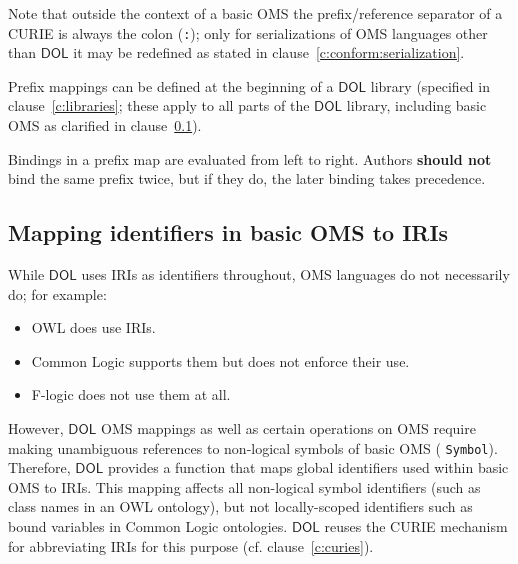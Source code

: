 \documentclass[10pt,fleqn,final]{scrreprt}
\makeatletter
\newcommand*{\cf}{cf.\@\xspace}
\newcommand*\CommentAuthor{}
\renewcommand*\CommentAuthor{#1}}
\newcommand*\CommentDate{}
\renewcommand*\CommentDate{#1}}
\newcommand*\CommentId{}
\renewcommand*\CommentId{#1}}
\newcommand*\CommentType{}
\renewcommand*\CommentType{#1}}
\newcommand*{\SetCommentColorByType}[1]{%
\edef\localType{{#1}}%
\expandafter\ifstrequal\localType{q-aut}{\colorlet{CommentColor}{red}}{%
\expandafter\ifstrequal\localType{q-all}{\colorlet{CommentColor}{orange}}{%
\expandafter\ifstrequal\localType{todo}{\colorlet{CommentColor}{orange}}{%
\expandafter\ifstrequal\localType{fyi}{\colorlet{CommentColor}{lightgray}}{%
\colorlet{CommentColor}{yellow}}}}}}
\newcommand*{\SetCommentPrefixByType}[1]{%
\edef\localType{{#1}}%
\expandafter\@ifmtarg\localType{%
\edef\CommentPrefix{}%
}{%
\caseupper[q]{#1}%
\edef\CommentPrefix{\thestring: }%
}}
\newcommand*{\initComment}[1]{%
\setkeys{Comment}{#1}%
\SetCommentColorByType{\CommentType}%
\relax%
\SetCommentPrefixByType{\CommentType}%
\relax%
}
\newcommand*{\todonote}[2][]{%
\initComment{#1}%
\pdfcomment[author=\CommentAuthor,color=CommentColor,date=\CommentDate,id=\CommentId]{%
\CommentPrefix
#2}}
\renewcommand*{\todonote}[2][]{%
\initComment{#1}%
\ednote{\CommentPrefix #2}}
\newcommand*{\CLnote}[2][author=Christoph Lange]{%
\todonote[author=Christoph Lange,#1]{#2} 
}
\newcommand*{\syntax}[1]{\texttt{#1}}
\newcommand*{\shouldnot}{\textbf{should not}\xspace}
\newcommand*{\DOL}{\ensuremath{\mathsf{DOL}}\xspace}
\newcommand{\clauserefname}{clause}
\newcommand{\noterefname}{note}
\newcommand{\cref}[1]{\clauserefname~\ref{#1}}
\newcommand{\nref}[1]{\noterefname~\ref{#1}}
\newcommand{\ssclause}[1]{\subsection{#1}}
\renewcommand{\nref}[1]{\ref{nref-#1}} %
\newenvironment{definitions}[0]{\medskip }{}
\providecommand{\DIFadd}[1]{{\protect\color{blue}\uwave{#1}}} %
\providecommand{\DIFaddbegin}{} %
\providecommand{\DIFaddend}{} %
\providecommand{\DIFdelbegin}{} %
\providecommand{\DIFdelend}{} %
\makeatother
\begin{document}
\begin{definitions}
Note that outside the context of a basic OMS the prefix/reference separator of a CURIE is always the colon (\syntax{:}); only for serializations of OMS languages other than \DOL it may be redefined as stated in \cref{c:conform:serialization}.

Prefix mappings can be defined at the beginning of a \DOL library (specified in \cref{c:libraries}; 
these apply to all parts of the \DOL library, including basic OMS as clarified in \cref{c:map-ids}).  

Bindings in a prefix map are evaluated from left to right.  Authors \shouldnot bind the same prefix twice, but if they do, the later binding takes precedence.

\ssclause{Mapping identifiers in basic OMS to IRIs}\label{c:map-ids}

While \DOL uses IRIs as identifiers throughout, OMS languages do not necessarily do; for example:
\begin{itemize}
\item OWL \DIFdelbegin %
\DIFdelend \DIFaddbegin \DIFadd{\nref{OWL2}, Section 5.5 }\DIFaddend does use IRIs.
\item Common Logic \DIFdelbegin %
\DIFdelend \DIFaddbegin \DIFadd{\nref{CL} }\DIFaddend supports them but does not enforce their use.
\item F-logic \cite{flogic} does not use them at all.
\end{itemize}
However, \DOL OMS mappings as well as 
certain operations on OMS require making unambiguous references to non-logical symbols of basic OMS (\DIFdelbegin %
\DIFdelend \DIFaddbegin \syntax{Symbol}\DIFaddend ).  Therefore, \DOL provides a function that maps global identifiers used within basic OMS to IRIs.  This mapping affects all non-logical symbol identifiers (such as class names in an OWL ontology), but not locally-scoped identifiers such as bound variables in Common Logic ontologies.  \DOL reuses the CURIE mechanism for abbreviating IRIs for this purpose (\cf \cref{c:curies}).


\end{definitions}
\end{document}
